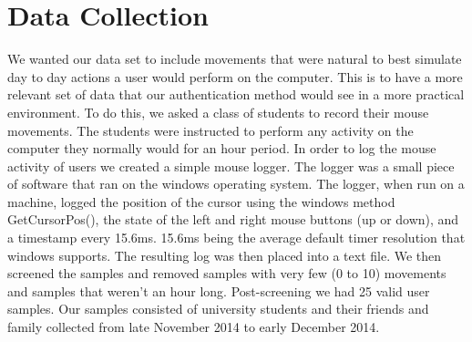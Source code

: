 \documentclass[conference]{IEEEtran}
\begin{document}
\section{Data Collection}
We wanted our data set to include movements that were natural to best simulate day to day actions a user would perform on the computer. This is to have a more relevant set of data that our authentication method would see in a more practical environment. To do this, we asked a class of students to record their mouse movements. The students were instructed to perform any activity on the computer they normally would for an hour period.
	In order to log the mouse activity of users we created a simple mouse logger.  The logger was a small piece of software that ran on the windows operating system. The logger, when run on a machine, logged the position of the cursor using the windows method GetCursorPos(), the state of the left and right mouse buttons (up or down), and a timestamp every 15.6ms. 15.6ms being the average default timer resolution that windows supports. The resulting log was then placed into a text file. 
We then screened the samples and removed samples with very few (0 to 10) movements and samples that weren't an hour long. Post-screening we had 25 valid user samples.  Our samples consisted of university students and their friends and family collected from late November 2014 to early December 2014.


\bgroup
{}
\def\arraystretch{1.5}
\egroup
\end{document}
